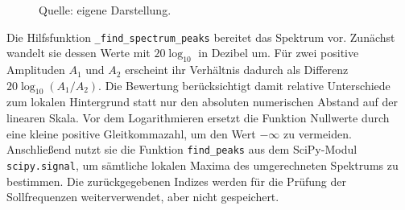 \begin{figure}[htbp]
  \centering
  \caption{Ablauf der implementierten Einzelpeakprüfung}
  \label{fig:peakpruefung_ablauf}
  \caption*{\footnotesize Quelle: eigene Darstellung.}
\end{figure}

Die Hilfsfunktion \texttt{\_find\_spectrum\_peaks} bereitet das Spektrum vor.
Zunächst wandelt sie dessen Werte mit $20\log_{10}$ in Dezibel
um. Für zwei positive Amplituden $A_1$ und $A_2$ erscheint ihr Verhältnis
dadurch als Differenz
$20\log_{10}(A_1/A_2)$. Die Bewertung berücksichtigt damit relative
Unterschiede zum lokalen Hintergrund statt nur den absoluten numerischen
Abstand auf der linearen Skala. Vor dem Logarithmieren ersetzt die Funktion
Nullwerte durch eine kleine positive Gleitkommazahl, um den Wert $-\infty$ zu
vermeiden. Anschließend nutzt sie die Funktion \texttt{find\_peaks} aus dem
SciPy-Modul \texttt{scipy.signal}, um sämtliche lokalen Maxima des
umgerechneten Spektrums zu bestimmen. Die zurückgegebenen Indizes werden für
die Prüfung der Sollfrequenzen weiterverwendet, aber nicht gespeichert.

